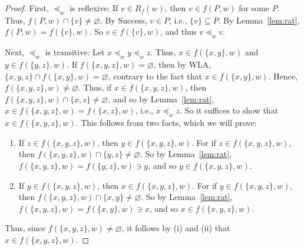 \documentclass[12pt]{article}
\begin{document}
\begin{proof}
    First, $\preceq_w$ is reflexive: 
    If $v \in R_f(w)$, then $v \in f(P,w)$ for some $P$. 
    Thus, $f(P,w) \cap \{v\} \neq \varnothing$. 
    By Success, $v \in P$, i.e., $\{v\} \subseteq P$. 
    By Lemma~\ref{lem:rat}, $f(P,w) = f(\{v\},w)$. 
    So $v \in f(\{v\},w)$, and thus $v \preceq_w v$. 

    Next, $\preceq_w$ is transitive: 
    Let $x \preceq_w y \preceq_w z$. 
    Thus, $x \in f(\{x,y\},w)$ and $y \in f(\{y,z\},w)$. 
    If $f(\{x,y,z\},w) = \varnothing$, then by WLA, $\{x,y,z\} \cap f(\{x,y\},w) = \varnothing$, contrary to the fact that $x \in f(\{x,y\},w)$. 
    Hence, $f(\{x,y,z\},w) \neq \varnothing$. 
    Thus, if $x \in f(\{x,y,z\},w)$, then $f(\{x,y,z\},w) \cap \{x,z\} \neq \varnothing$, and so by Lemma~\ref{lem:rat}, $x \in f(\{x,y,z\},w) = f(\{x,z\},w)$, i.e., $x \preceq_w z$. 
    So it suffices to show that $x \in f(\{x,y,z\},w)$. 
    This follows from two facts, which we will prove:
    \begin{enumerate}[label=(\roman*)]
        \item If $z \in f(\{x,y,z\},w)$, then $y \in f(\{x,y,z\},w)$. For if $z \in f(\{x,y,z\},w)$, then $f(\{x,y,z\},w) \cap \{y,z\} \neq \varnothing$. So by Lemma~\ref{lem:rat}, $f(\{x,y,z\},w) = f(\{y,z\},w) \ni y$, and so $y \in f(\{x,y,z\},w)$. 
        \item If $y \in f(\{x,y,z\},w)$, then $x \in f(\{x,y,z\},w)$. For if $y \in f(\{x,y,z\},w)$, then $f(\{x,y,z\},w) \cap \{x,y\} \neq \varnothing$. So by Lemma~\ref{lem:rat}, $f(\{x,y,z\},w) = f(\{x,y\},w) \ni x$, and so $x \in f(\{x,y,z\},w)$. 
    \end{enumerate}
    Thus, since $f(\{x,y,z\},w) \neq \varnothing$, it follows by (i) and (ii) that $x \in f(\{x,y,z\},w)$. 
    

\end{proof}
\end{document}
